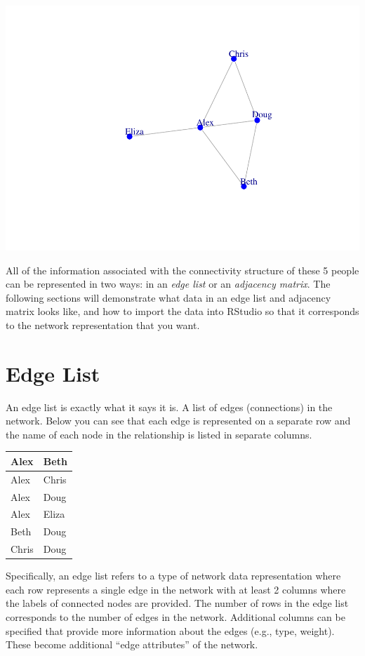 \documentclass[
]{book}
\begin{document}
\includegraphics{bookdown-demo_files/figure-latex/unnamed-chunk-30-1.pdf}

All of the information associated with the connectivity structure of these 5 people can be represented in two ways: in an \emph{edge list} or an \emph{adjacency matrix}. The following sections will demonstrate what data in an edge list and adjacency matrix looks like, and how to import the data into RStudio so that it corresponds to the network representation that you want.

\section{Edge List}\label{edge-list}

An edge list is exactly what it says it is. A list of edges (connections) in the network. Below you can see that each edge is represented on a separate row and the name of each node in the relationship is listed in separate columns.

\begin{table}
\centering
\begin{tabular}{l|l}
\hline
Alex & Beth\\
\hline
Alex & Chris\\
\hline
Alex & Doug\\
\hline
Alex & Eliza\\
\hline
Beth & Doug\\
\hline
Chris & Doug\\
\hline
\end{tabular}
\end{table}

Specifically, an edge list refers to a type of network data representation where each row represents a single edge in the network with at least 2 columns where the labels of connected nodes are provided. The number of rows in the edge list corresponds to the number of edges in the network. Additional columns can be specified that provide more information about the edges (e.g., type, weight). These become additional ``edge attributes'' of the network.
\end{document}
